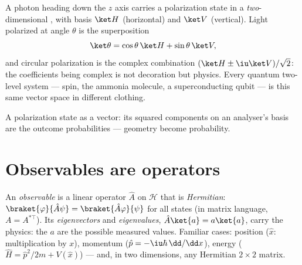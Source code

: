 \begin{example}\label{ex:b3:quantum-formalism:polarization}
A photon heading down the $z$ axis carries a polarization state in a
\emph{two}-dimensional , with basis $\ket H$
(horizontal) and $\ket V$ (vertical). Light polarized at angle
$\theta$ is the superposition
\[
\ket\theta = \cos\theta\,\ket H + \sin\theta\,\ket V ,
\]
and circular polarization is the complex combination $(\ket H \pm
\iu\ket V)/\sqrt2$: the coefficients being complex is not decoration
but physics. Every quantum two-level system --- spin, the ammonia
molecule, a superconducting qubit --- is this same vector space in
different clothing.
\end{example}

\begin{omfigure}

{\small A polarization state as a vector: its squared components on
an analyser's basis are the outcome probabilities --- geometry become
probability.}
\end{omfigure}

\section{Observables are operators}

\begin{definition}[Observables]\label{def:b3:quantum-formalism:observable}
An \emph{observable} is a linear operator $\hat A$ on $\mathcal H$
that is \emph{Hermitian}: $\braket{\varphi}{\hat A\psi} =
\braket{\hat A\varphi}{\psi}$ for all states (in matrix language,
$A = A^{*\top}$). Its \emph{eigenvectors} and \emph{eigenvalues},
$\hat A\ket{a} = a\ket{a}$, carry the physics: the $a$ are the
possible measured values. Familiar cases: position ($\hat x$:
multiplication by $x$), momentum ($\hat p = -\iu\hbar\,\dd/\dd x$),
energy ($\hat H = \hat p^2/2m + V(\hat x)$) --- and, in two
dimensions, any Hermitian $2\times2$ matrix.
\end{definition}

